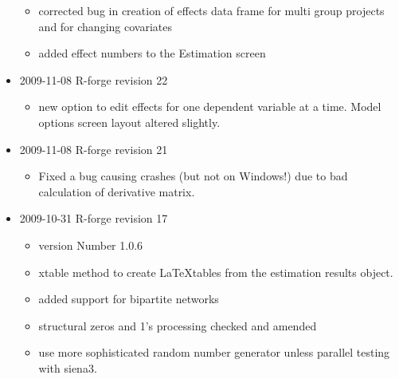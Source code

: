 \documentclass[a4paper,fleqn,11pt]{article}
\newcommand{\+}{\, + \,}
\begin{document}
\begin{small}
\begin{itemize}
  \begin{itemize}
  \item corrected bug in creation of effects data frame for multi
    group projects and for changing covariates
  \item added effect numbers to the Estimation screen
  \end{itemize}
\item 2009-11-08 R-forge revision 22
  \begin{itemize}
  \item  new option to edit effects for one dependent variable at a time. Model
    options screen layout altered slightly.
  \end{itemize}
\item 2009-11-08 R-forge revision 21
  \begin{itemize}
  \item Fixed a bug causing crashes (but not on Windows!) due to bad calculation
    of derivative matrix.
  \end{itemize}
\item 2009-10-31 R-forge revision 17
\begin{itemize}
\item version Number 1.0.6
    \item xtable method to create \LaTeX tables from the estimation results
      object.
    \item added support for bipartite networks
    \item structural zeros and 1's processing checked and amended
   \item  use more sophisticated random number generator unless parallel
     testing with siena3.
   \end{itemize}
 \end{itemize}
 \end{small}

\newpage

%

\end{document}
